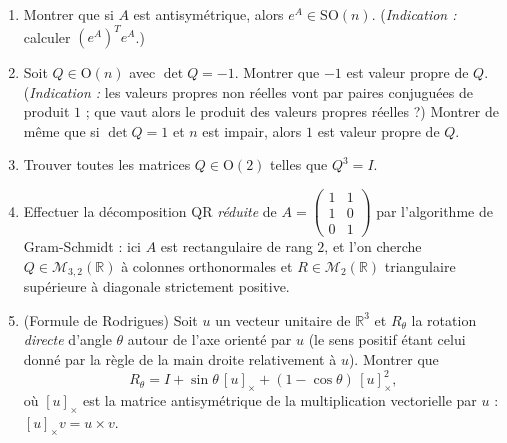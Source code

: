 \vspace{6pt}
\exolabel

\begin{mdframed}[style=exobar]
  \begin{enumerate}
    \item Montrer que si $A$ est antisymétrique, alors $e^A \in \mathrm{SO}(n)$.
          (\textit{Indication :} calculer ${(e^A)}^T e^A$.)

    \item Soit $Q \in \mathrm{O}(n)$ avec $\det Q = -1$. Montrer que $-1$ est
          valeur propre de $Q$. (\textit{Indication :} les valeurs propres non
          réelles vont par paires conjuguées de produit $1$ ; que vaut alors le
          produit des valeurs propres réelles ?) Montrer de même que si
          $\det Q = 1$ et $n$ est impair, alors $1$ est valeur propre de $Q$.

    \item Trouver toutes les matrices $Q \in \mathrm{O}(2)$ telles que $Q^3 = I$.

    \item Effectuer la décomposition QR \emph{réduite} de
          $A = \begin{pmatrix}1&1\\1&0\\0&1\end{pmatrix}$
          par l'algorithme de Gram-Schmidt : ici $A$ est rectangulaire de rang $2$,
          et l'on cherche $Q \in \mathcal{M}_{3,2}(\mathbb{R})$ à colonnes
          orthonormales et $R \in \mathcal{M}_2(\mathbb{R})$ triangulaire
          supérieure à diagonale strictement positive.

    \item (Formule de Rodrigues) Soit $u$ un vecteur unitaire de $\mathbb{R}^3$
          et $R_\theta$ la rotation \emph{directe} d'angle $\theta$ autour de l'axe
          orienté par $u$ (le sens positif étant celui donné par la règle de la main
          droite relativement à $u$). Montrer que
          \[
            R_\theta = I + \sin\theta\,[u]_\times + (1-\cos\theta)\,[u]_\times^2,
          \]
          où $[u]_\times$ est la matrice antisymétrique de la multiplication
          vectorielle par $u$ : $[u]_\times v = u \times v$.
  \end{enumerate}
\end{mdframed}


